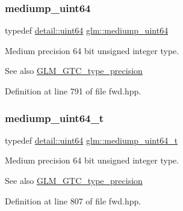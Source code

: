 \subsubsection{\texorpdfstring{mediump\+\_\+uint64}{mediump\_uint64}}
{\footnotesize\ttfamily typedef \hyperlink{namespaceglm_1_1detail_adec4b19bf4982125e122db2fe03c5810}{detail\+::uint64} \hyperlink{group__gtc__type__precision_ga6685788d15d0a973ee7c2460d0456dc1}{glm\+::mediump\+\_\+uint64}}

Medium precision 64 bit unsigned integer type. \begin{DoxySeeAlso}{See also}
\hyperlink{group__gtc__type__precision}{G\+L\+M\+\_\+\+G\+T\+C\+\_\+type\+\_\+precision} 
\end{DoxySeeAlso}


Definition at line 791 of file fwd.\+hpp.

\mbox{\label{group__gtc__type__precision_gaa97354d3120a6dc029a5e9563723de18}} 
\subsubsection{\texorpdfstring{mediump\+\_\+uint64\+\_\+t}{mediump\_uint64\_t}}
{\footnotesize\ttfamily typedef \hyperlink{namespaceglm_1_1detail_adec4b19bf4982125e122db2fe03c5810}{detail\+::uint64} \hyperlink{group__gtc__type__precision_gaa97354d3120a6dc029a5e9563723de18}{glm\+::mediump\+\_\+uint64\+\_\+t}}

Medium precision 64 bit unsigned integer type. \begin{DoxySeeAlso}{See also}
\hyperlink{group__gtc__type__precision}{G\+L\+M\+\_\+\+G\+T\+C\+\_\+type\+\_\+precision} 
\end{DoxySeeAlso}


Definition at line 807 of file fwd.\+hpp.

\mbox{\label{group__gtc__type__precision_gac4b849eaac0543a10f97f4bdda4850a8}} 
